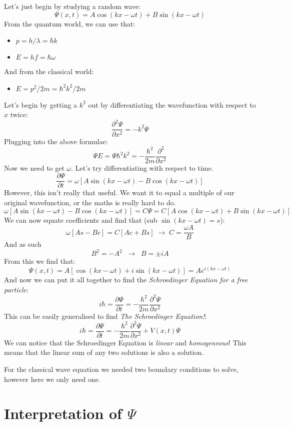 Let's just begin by studying a random wave:
$$
	\Psi(x,t) = A\cos(kx - \omega t) + B\sin(kx - \omega t)
$$
From the quantum world, we can use that:
\begin{itemize}
	\item $p = h/\lambda = \hbar k$
	\item $E = hf = \hbar\omega$
\end{itemize}
And from the classical world:
\begin{itemize}
	\item $E = p^2/2m = \hbar^2k^2/2m$
\end{itemize}
Let's begin by getting a $k^2$ out by differentiating the wavefunction with
respect to $x$ twice:
$$
	\frac{\partial^2 \Psi}{\partial x^2} = -k^2\Psi
$$
Plugging into the above formulae:
$$
	\Psi E = \Psi \hbar^2 k^2 =
	-\frac{\hbar^2}{2m} \frac{\partial^2}{\partial x^2}
$$
Now we need to get $\omega$. Let's try differentiating with respect to time.
$$
	\frac{\partial \Psi}{\partial t} =
	\omega \left[A\sin(kx - \omega t) - B\cos(kx - \omega t)\right]
$$
However, this isn't really that useful. We want it to equal a multiple of our
original wavefunction, or the maths is really hard to do.
$$
	\omega \left[A\sin(kx - \omega t) - B\cos(kx - \omega t)\right] = 
	C\Psi = C\left[A\cos(kx - \omega t) + B\sin(kx - \omega t)\right]
$$
We can now equate coefficients and find that (sub $\sin(kx-\omega t) = s$):
$$
	\omega[As - Bc] = C[Ac + Bs]
	\; \rightarrow \;
	C = \frac{\omega A}{B}
$$
And as such
$$
	B^2 = -A^2 \; \; \rightarrow \; \; B = \pm iA
$$
From this we find that:
$$
	\Psi(x,t) = A\left[\cos(kx-\omega t) + i\sin(kx - \omega t)\right] =
	Ae^{i(kx-\omega t)}
$$
And now we can put it all together to find the \emph{Schroedinger Equation for a
free particle}:
$$
	i\hbar = \frac{\partial \Psi}{\partial t} =
	-\frac{\hbar^2}{2m}\frac{\partial^2\Psi}{\partial x^2}
$$
This can be easily generalised to find \emph{The Schroedinger Equation!}:
$$
	i\hbar = \frac{\partial \Psi}{\partial t} =
	-\frac{\hbar^2}{2m}\frac{\partial^2\Psi}{\partial x^2} +
	V(x,t)\Psi
$$
We can notice that the Schroedinger Equation is \emph{linear} and
\emph{homogeneous}! This means that the linear sum of any two solutions is also
a solution.

For the classical wave equation we needed two boundary conditions to solve,
however here we only need one.

\section{Interpretation of $\Psi$}

